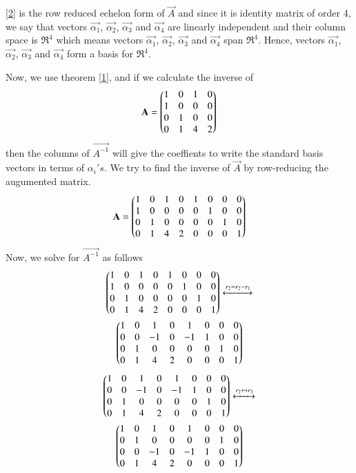 \documentclass[journal,12pt,twocolumn]{IEEEtran}
\begin{document}
\eqref{2} is the row reduced echelon form of $\vec{A}$ and since it is identity matrix of order 4, we say that vectors $\vec{\alpha_1}$, $\vec{\alpha_2}$, $\vec{\alpha_3}$ and $\vec{\alpha_4}$ are linearly independent and their column space is $\Re^4$ which means vectors $\vec{\alpha_1}$, $\vec{\alpha_2}$, $\vec{\alpha_3}$ and $\vec{\alpha_4}$ span $\Re^4$.
Hence, vectors $\vec{\alpha_1}$, $\vec{\alpha_2}$, $\vec{\alpha_3}$ and $\vec{\alpha_4}$ form a basis for $\Re^4$. 

Now, we use theorem \eqref{1}, and if we calculate the inverse of 
\begin{align}
	\mathbf{A} = \begin{pmatrix}1 & 0 & 1 & 0 \\ 1 & 0 & 0 & 0 \\ 0 & 1 & 0 & 0 \\ 0 & 1 & 4 & 2\end{pmatrix}
\end{align}
then the columns of $\vec{A^{-1}}$ will give the coeffients to write the standard basis vectors in terms of $\alpha_i's$. We try to find the inverse of $\vec{A}$ by row-reducing the augumented matrix. 
\begin{align}
	\mathbf{A} = \begin{pmatrix}1 & 0 & 1 & 0& 1 &0 &0 & 0 \\ 1 & 0 & 0 & 0& 0&1 &0&0 \\ 0 & 1 & 0 & 0& 0 &0 &1 &0 \\ 0 & 1 & 4 & 2& 0 & 0& 0 &1\end{pmatrix}
\end{align}
Now, we solve for $\vec{A^{-1}}$ as follows 
\begin{multline}
 \begin{pmatrix}1 & 0 & 1 & 0& 1 &0 &0 & 0 \\ 1 & 0 & 0 & 0& 0&1 &0&0 \\ 0 & 1 & 0 & 0& 0 &0 &1 &0 \\ 0 & 1 & 4 & 2& 0 & 0& 0 &1\end{pmatrix} \xleftrightarrow[]{r_2=r_2-r_1} \\ \begin{pmatrix}1 & 0 & 1 & 0& 1 &0 &0 & 0 \\ 0 & 0 & -1 & 0& -1&1 &0&0 \\ 0 & 1 & 0 & 0& 0 &0 &1 &0 \\ 0 & 1 & 4 & 2& 0 & 0& 0 &1\end{pmatrix}
\end{multline}
\begin{multline}
\begin{pmatrix}1 & 0 & 1 & 0& 1 &0 &0 & 0 \\ 0 & 0 & -1 & 0& -1&1 &0&0 \\ 0 & 1 & 0 & 0& 0 &0 &1 &0 \\ 0 & 1 & 4 & 2& 0 & 0& 0 &1\end{pmatrix}\xleftrightarrow[]{r_2 \leftrightarrow r_3} \\ \begin{pmatrix}1 & 0 & 1 & 0& 1 &0 &0 & 0 \\0 & 1 & 0 & 0& 0 &0 &1 &0 \\ 0 & 0 & -1 & 0& -1&1 &0&0  \\ 0 & 1 & 4 & 2& 0 & 0& 0 &1\end{pmatrix}
\end{multline}
\end{document}

